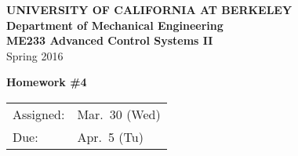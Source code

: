 \documentclass[letterpaper,12pt]{article}
\begin{document}
\begin{center}
    {\bf UNIVERSITY OF CALIFORNIA AT BERKELEY}\\
    {\bf Department of Mechanical Engineering}\\
    {\bf ME233  Advanced Control Systems II}\\
    Spring 2016\\
\end{center}
\noindent
{\Large \bf Homework \#4 }\\[-3em]
\begin{flushright}
\begin{tabular} {l l}
    Assigned: &  Mar.\ 30 (Wed)\\
    Due: & Apr.\ 5 (Tu)
\end{tabular}
\end{flushright}

\begin{enumerate}












\end{enumerate}
\end{document}
